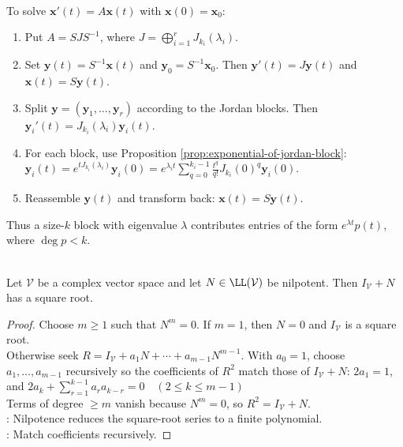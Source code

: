 \begin{method} \label{meth:solve-linear-ode-by-jordan-form} \\
To solve $\mathbf{x}'(t)=A\mathbf{x}(t)$ with $\mathbf{x}(0)=\mathbf{x}_0$:
\begin{enumerate}[label=(\roman*)]
\setlength{\itemsep}{0pt}
\item Put $A=SJS^{-1}$, where $J=\bigoplus_{i=1}^rJ_{k_i}(\lambda_i)$.
\item Set $\mathbf{y}(t)=S^{-1}\mathbf{x}(t)$ and $\mathbf{y}_0=S^{-1}\mathbf{x}_0$. Then $\mathbf{y}'(t)=J\mathbf{y}(t)$ and $\mathbf{x}(t)=S\mathbf{y}(t)$.
\item Split $\mathbf{y}=(\mathbf{y}_1,\ldots,\mathbf{y}_r)$ according to the Jordan blocks. Then $\mathbf{y}_i'(t)=J_{k_i}(\lambda_i)\mathbf{y}_i(t)$.
\item For each block, use Proposition \ref{prop:exponential-of-jordan-block}: $\mathbf{y}_i(t) =e^{tJ_{k_i}(\lambda_i)}\mathbf{y}_i(0) =e^{\lambda_i t}\sum\limits_{q=0}^{k_i-1}\frac{t^q}{q!}J_{k_i}(0)^q\mathbf{y}_i(0)$.
\item Reassemble $\mathbf{y}(t)$ and transform back: $\mathbf{x}(t)=S\mathbf{y}(t)$.
\end{enumerate}
Thus a size-$k$ block with eigenvalue $\lambda$ contributes entries of the form $e^{\lambda t}p(t)$, where $\deg p<k$.
\end{method}

\begin{lemma} \label{lem:identity-plus-nilpotent-square-root} \\
Let $\mathcal{V}$ be a complex vector space and let $N\in\LL(\mathcal{V})$ be nilpotent. Then $I_{\mathcal{V}}+N$ has a square root.
\begin{proof}
Choose $m\geq1$ such that $N^m=0$. If $m=1$, then $N=0$ and $I_{\mathcal{V}}$ is a square root.\\
Otherwise seek $R=I_{\mathcal{V}}+a_1N+\cdots+a_{m-1}N^{m-1}$. With $a_0=1$, choose $a_1,\ldots,a_{m-1}$ recursively so the coefficients of $R^2$ match those of $I_{\mathcal{V}}+N$: $2a_1=1$, and $2a_k+\sum\limits_{r=1}^{k-1}a_ra_{k-r}=0\quad (2\leq k\leq m-1)$\\
Terms of degree $\geq m$ vanish because $N^m=0$, so $R^2=I_{\mathcal{V}}+N$.\\
: Nilpotence reduces the square-root series to a finite polynomial.\\
: Match coefficients recursively.
\end{proof}
\end{lemma}


